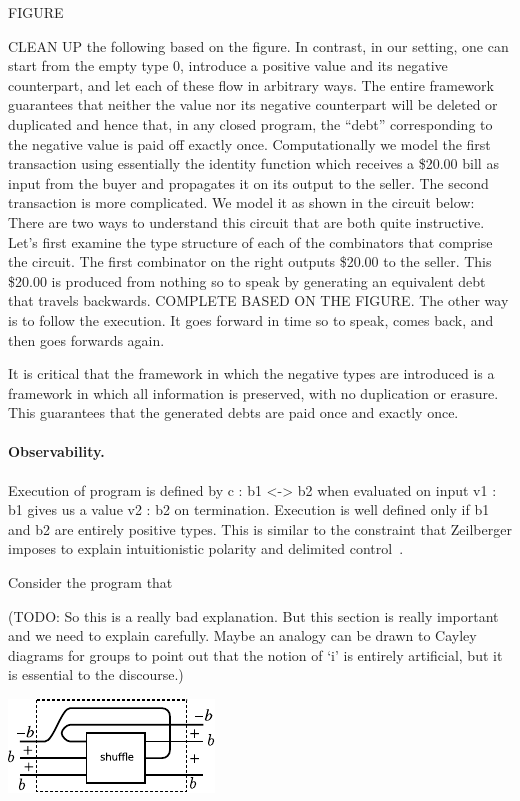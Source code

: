 \documentclass[preprint]{sigplanconf}
\begin{document}
FIGURE

CLEAN UP the following based on the figure. In contrast, in our setting, one
can start from the empty type $0$, introduce a positive value and its
negative counterpart, and let each of these flow in arbitrary ways. The
entire framework guarantees that neither the value nor its negative
counterpart will be deleted or duplicated and hence that, in any closed
program, the ``debt'' corresponding to the negative value is paid off exactly
once. Computationally we model the first transaction using essentially the
identity function which receives a \$20.00 bill as input from the buyer and
propagates it on its output to the seller. The second transaction is more
complicated. We model it as shown in the circuit below: There are two ways to
understand this circuit that are both quite instructive. Let's first examine
the type structure of each of the combinators that comprise the circuit. The
first combinator on the right outputs \$20.00 to the seller. This \$20.00 is
produced from nothing so to speak by generating an equivalent debt that
travels backwards. COMPLETE BASED ON THE FIGURE. The other way is to follow
the execution. It goes forward in time so to speak, comes back, and then goes
forwards again.

It is critical that the framework in which the negative types are introduced
is a framework in which all information is preserved, with no duplication or
erasure. This guarantees that the generated debts are paid once and exactly
once.

\paragraph*{Observability.} 
Execution of program is defined by {{c : b1 <-> b2}} when evaluated on input
{{v1 : b1}} gives us a value {{v2 : b2}} on termination. Execution is well
defined only if {{b1}} and {{b2}} are entirely positive types. This is
similar to the constraint that Zeilberger imposes to explain intuitionistic
polarity and delimited control~\cite{10.1109/LICS.2010.23}.

Consider the program that

(TODO: So this is a really bad explanation. But this section is really
important and we need to explain carefully. Maybe an analogy can be
drawn to Cayley diagrams for groups to point out that the notion of
`i' is entirely artificial, but it is essential to the discourse.)

\begin{center}
  \includegraphics{diagrams/shuffle.pdf}
\end{center}
\end{document}
